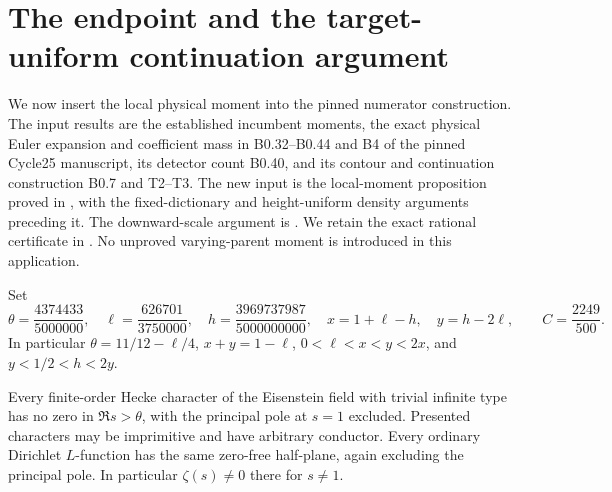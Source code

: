 \section{The endpoint and the target-uniform continuation argument}
\label{sec:endpoint-assembly}

We now insert the local physical moment into the pinned numerator
construction. The input results are the established incumbent moments,
the exact physical Euler expansion and coefficient mass in B0.32--B0.44
and B4 of the pinned Cycle25 manuscript, its detector count B0.40, and
its contour and continuation construction B0.7 and T2--T3. The new input
is the local-moment proposition proved in
, with the fixed-dictionary and
height-uniform density arguments preceding it. The downward-scale
argument is . We retain the exact
rational certificate in .
No unproved varying-parent moment is introduced in this application.

Set
\[
 \theta=\frac{4374433}{5000000},\quad
 \ell=\frac{626701}{3750000},\quad
 h=\frac{3969737987}{5000000000},\quad
 x=1+\ell-h,\quad y=h-2\ell,
 \qquad C=\frac{2249}{500}.
\]
In particular $\theta=11/12-\ell/4$, $x+y=1-\ell$,
$0<\ell<x<y<2x$, and $y<1/2<h<2y$.

\begin{theorem}
Every finite-order Hecke character of the Eisenstein field with trivial
infinite type has no zero in $\Re s>\theta$, with the principal pole at
$s=1$ excluded. Presented characters may be imprimitive and have
arbitrary conductor. Every ordinary Dirichlet $L$-function has the same
zero-free half-plane, again excluding the principal pole. In particular
$\zeta(s)\ne0$ there for $s\ne1$.
\end{theorem}

